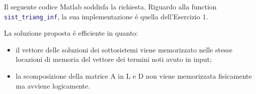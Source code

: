 \begin{center}
\footnotesize\noindent{}\end{center}

\noindent Il seguente codice Matlab soddisfa la richiesta. Riguardo alla function \lstinline[language=Matlab]{sist_triang_inf}, la sua implementazione \'e quella dell'Esercizio 1.



\noindent La soluzione proposta \'e efficiente in quanto:
\begin{itemize}

\item il vettore delle soluzioni dei sottosistemi viene memorizzato nelle stesse locazioni di memoria del vettore dei termini noti avuto in input;
\item la scomposizione della matrice A in L e D non viene memorizzata fisicamente ma avviene logicamente.

\end{itemize}
